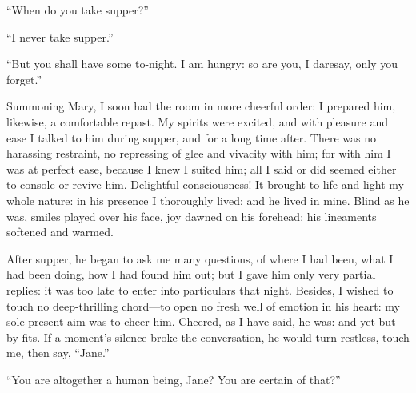 \enquote{When do you take supper?}

\enquote{I never take supper.}

\enquote{But you shall have some to-night. I am hungry: so are you, I
daresay, only you forget.}

Summoning Mary, I soon had the room in more cheerful order: I prepared
him, likewise, a comfortable repast. My spirits were excited, and with
pleasure and ease I talked to him during supper, and for a long time
after. There was no harassing restraint, no repressing of glee and
vivacity with him; for with him I was at perfect ease, because I knew I
suited him; all I said or did seemed either to console or revive him. 
Delightful consciousness! It brought to life and light my whole nature:
in his presence I thoroughly lived; and he lived in mine. Blind as he
was, smiles played over his face, joy dawned on his forehead: his
lineaments softened and warmed.

After supper, he began to ask me many questions, of where I had been,
what I had been doing, how I had found him out; but I gave him only very
partial replies: it was too late to enter into particulars that night. 
Besides, I wished to touch no deep-thrilling chord---to open no fresh
well of emotion in his heart: my sole present aim was to cheer him. 
Cheered, as I have said, he was: and yet but by fits. If a moment's
silence broke the conversation, he would turn restless, touch me, then
say, \enquote{Jane.}

\enquote{You are altogether a human being, Jane? You are certain of
that?}

